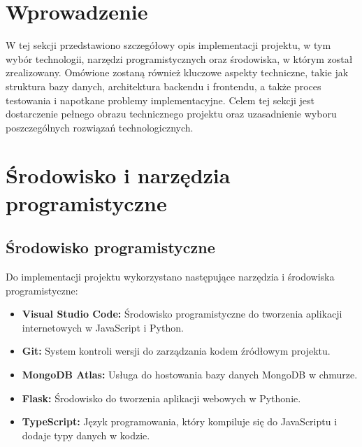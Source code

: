 \section{Wprowadzenie}
W tej sekcji przedstawiono szczegółowy opis implementacji projektu, w tym wybór technologii, narzędzi programistycznych oraz środowiska, w którym został zrealizowany. Omówione zostaną również kluczowe aspekty techniczne, takie jak struktura bazy danych, architektura backendu i frontendu, a także proces testowania i napotkane problemy implementacyjne. Celem tej sekcji jest dostarczenie pełnego obrazu technicznego projektu oraz uzasadnienie wyboru poszczególnych rozwiązań technologicznych.


\section{Środowisko i narzędzia programistyczne}

\subsection{Środowisko programistyczne}
Do implementacji projektu wykorzystano następujące narzędzia i środowiska programistyczne:
\begin{itemize}
    \item \textbf{Visual Studio Code:} Środowisko programistyczne do tworzenia aplikacji internetowych w JavaScript i Python.
    \item \textbf{Git:} System kontroli wersji do zarządzania kodem źródłowym projektu.
    \item \textbf{MongoDB Atlas:} Usługa do hostowania bazy danych MongoDB w chmurze.
    \item \textbf{Flask:} Środowisko do tworzenia aplikacji webowych w Pythonie.
    \item \textbf{TypeScript:} Język programowania, który kompiluje się do JavaScriptu i dodaje typy danych w kodzie.

\end{itemize}
